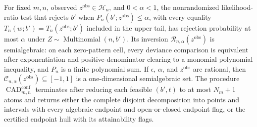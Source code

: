 For fixed \(m,n\), observed \(z^{\mathrm{obs}}\in\mathcal H_n\), and \(0<\alpha<1\), the nonrandomized likelihood-ratio test that rejects \(b'\) when \(P_n(b';z^{\mathrm{obs}})\le\alpha\), with every equality \(T_n(w;b')=T_n(z^{\mathrm{obs}};b')\) included in the upper tail, has rejection probability at most \(\alpha\) under \(Z\sim\operatorname{Multinomial}(n,b')\). Its inversion \(\mathcal R_{n,\alpha}(z^{\mathrm{obs}})\) is semialgebraic: on each zero-pattern cell, every deviance comparison is equivalent after exponentiation and positive-denominator clearing to a monomial polynomial inequality, and \(P_n\) is a finite polynomial sum. If \(\epsilon\), \(\alpha\), and \(z^{\mathrm{obs}}\) are rational, then \(\mathcal C_{n,\alpha}(z^{\mathrm{obs}})\subseteq[-1,1]\) is a one-dimensional semialgebraic set. The procedure \(\operatorname{CAD}^{\mathrm{conf}}_{m,n}\) terminates after reducing each feasible \((b',t)\) to at most \(N_m+1\) atoms and returns either the complete disjoint decomposition into points and intervals with every algebraic endpoint and open-or-closed endpoint flag, or the certified endpoint hull with its attainability flags.